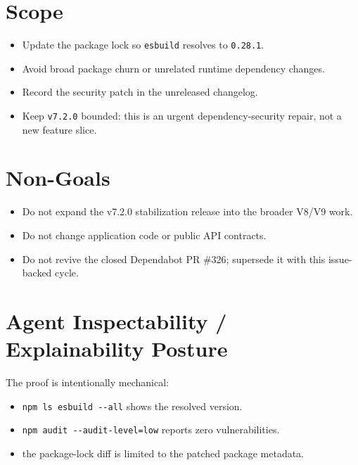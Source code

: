 \section{Scope}\label{record-215-scope}

\begin{itemize}
\tightlist
\item
  Update the package lock so \texttt{e\allowbreak{}s\allowbreak{}b\allowbreak{}u\allowbreak{}i\allowbreak{}l\allowbreak{}d} resolves to \texttt{0\allowbreak{}.\allowbreak{}2\allowbreak{}8\allowbreak{}.\allowbreak{}1}.
\item
  Avoid broad package churn or unrelated runtime dependency changes.
\item
  Record the security patch in the unreleased changelog.
\item
  Keep \texttt{v\allowbreak{}7\allowbreak{}.\allowbreak{}2\allowbreak{}.\allowbreak{}0} bounded: this is an urgent dependency-security repair, not a new feature slice.
\end{itemize}

\section{Non-Goals}\label{record-215-non-goals}

\begin{itemize}
\tightlist
\item
  Do not expand the v7.2.0 stabilization release into the broader V8/V9 work.
\item
  Do not change application code or public API contracts.
\item
  Do not revive the closed Dependabot PR \#326; supersede it with this issue-backed cycle.
\end{itemize}

\section{Agent Inspectability / Explainability Posture}\label{record-215-agent-inspectability-explainability-posture}

The proof is intentionally mechanical:

\begin{itemize}
\tightlist
\item
  \texttt{n\allowbreak{}p\allowbreak{}m\allowbreak{} \allowbreak{}l\allowbreak{}s\allowbreak{} \allowbreak{}e\allowbreak{}s\allowbreak{}b\allowbreak{}u\allowbreak{}i\allowbreak{}l\allowbreak{}d\allowbreak{} \allowbreak{}-\allowbreak{}-\allowbreak{}a\allowbreak{}l\allowbreak{}l} shows the resolved version.
\item
  \texttt{n\allowbreak{}p\allowbreak{}m\allowbreak{} \allowbreak{}a\allowbreak{}u\allowbreak{}d\allowbreak{}i\allowbreak{}t\allowbreak{} \allowbreak{}-\allowbreak{}-\allowbreak{}a\allowbreak{}u\allowbreak{}d\allowbreak{}i\allowbreak{}t\allowbreak{}-\allowbreak{}l\allowbreak{}e\allowbreak{}v\allowbreak{}e\allowbreak{}l\allowbreak{}=\allowbreak{}l\allowbreak{}o\allowbreak{}w} reports zero vulnerabilities.
\item
  the package-lock diff is limited to the patched package metadata.
\end{itemize}

